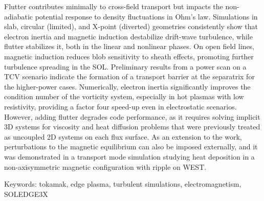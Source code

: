 Flutter contributes minimally to cross-field transport but impacts the non-adiabatic potential response to density fluctuations in Ohm's law. Simulations in slab, circular (limited), and X-point (diverted) geometries consistently show that electron inertia and magnetic induction destabilize drift-wave turbulence, while flutter stabilizes it, both in the linear and nonlinear phases. On open field lines, magnetic induction reduces blob sensitivity to sheath effects, promoting further turbulence spreading in the SOL. Preliminary results from a power scan on a TCV scenario indicate the formation of a transport barrier at the separatrix for the higher-power cases. Numerically, electron inertia significantly improves the condition number of the vorticity system, especially in hot plasmas with low resistivity, providing a factor four speed-up even in electrostatic scenarios. However, adding flutter degrades code performance, as it requires solving implicit 3D systems for viscosity and heat diffusion problems that were previously treated as uncoupled 2D systems on each flux surface. As an extension to the work, perturbations to the magnetic equilibrium can also be imposed externally, and it was demonstrated in a transport mode simulation studying heat deposition in a non-axisymmetric magnetic configuration with ripple on WEST.


\vspace{0.5cm}
Keywords: tokamak, edge plasma, turbulent simulations, electromagnetism, SOLEDGE3X
